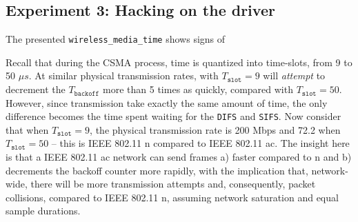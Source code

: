 





\subsection{Experiment 3: Hacking on the driver}

The presented \texttt{wireless\_media\_time} shows signs of


Recall that during the CSMA process, time is quantized into time-slots, from 9
to 50 $\mu s$. At similar physical transmission rates, with $T_{\texttt{slot}}
= 9$ will \emph{attempt} to decrement the $T_{\texttt{backoff}}$ more than 5
times as quickly, compared with $T_\texttt{slot} = 50$. However, since
transmission take exactly the same amount of time, the only difference becomes
the time spent waiting for the \texttt{DIFS} and \texttt{SIFS}. Now consider
that when $T_{\texttt{slot}} = 9$, the physical transmission rate is 200 Mbps
and 72.2 when $T_{\texttt{slot}} = 50$ -- this is IEEE 802.11 n compared to
IEEE 802.11 ac. The insight here is that a IEEE 802.11 ac network can send
frames a) faster compared to n and b) decrements the backoff counter more
rapidly, with the implication that, network-wide, there will be more
transmission attempts and, consequently, packet collisions, compared to
IEEE 802.11 n, assuming network saturation and equal sample durations.

